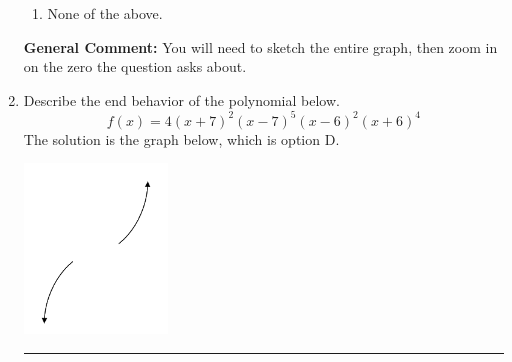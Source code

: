 \documentclass{extbook}[14pt]
\newcommand{\litem}[1]{\item #1

\rule{\textwidth}{0.4pt}}
\begin{document}
\begin{enumerate}
{\begin{enumerate}[label=\Alph*.]
\item None of the above.\end{enumerate}
\textbf{General Comment:} You will need to sketch the entire graph, then zoom in on the zero the question asks about.
}
\litem{
Describe the end behavior of the polynomial below.
\[ f(x) = 4(x + 7)^{2}(x - 7)^{5}(x - 6)^{2}(x + 6)^{4} \]The solution is the graph below, which is option D.
\begin{center}
    \includegraphics[width=0.3\textwidth]{../Figures/polyEndBehaviorCopyDC.png}

\end{center}}
\end{enumerate}
\end{document}
